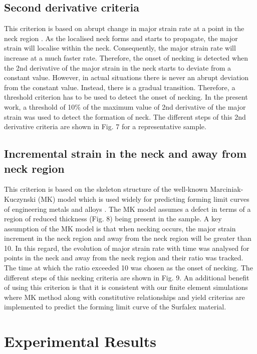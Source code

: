 \documentclass[11pt]{article} %
\begin{document}
\subsection{Second derivative criteria}
This criterion is based on abrupt change in major strain rate at a point in the neck region \cite{Song2019}. As the localised neck forms and starts to propagate, the major strain will localise within the neck. Consequently, the major strain rate will increase at a much faster rate. Therefore, the onset of necking is detected when the 2nd derivative of the major strain in the neck starts to deviate from a constant value.  However, in actual situations there is never an abrupt deviation from the constant value. Instead, there is a gradual transition. Therefore, a threshold criterion has to be used to detect the onset of necking. In the present work, a threshold of 10\% of the maximum value of 2nd derivative of the major strain was used to detect the formation of neck. The different steps of this 2nd derivative criteria are shown in Fig. 7 for a representative sample. 

\subsection{Incremental strain in the neck and away from neck region}
This criterion is based on the skeleton structure of the well-known Marciniak-Kuczynski (MK) model which is used widely for predicting forming limit curves of engineering metals and alloys \cite{Banabic2010}. The MK model assumes a defect in terms of a region of reduced thickness (Fig. 8) being present in the sample. A key assumption of the MK model is that when necking occurs, the major strain increment in the neck region and away from the neck region will be greater than 10\cite{Narasimhan1991}. In this regard, the evolution of major strain rate with time was analysed for points in the neck and away from the neck region and their ratio was tracked. The time at which the ratio exceeded 10 was chosen as the onset of necking. The different steps of this necking criteria are shown in Fig. 9. An additional benefit of using this criterion is that it is consistent with our finite element simulations where MK method along with constitutive relationships and yield criterias are implemented to predict the forming limit curve of the Surfalex material.   

\section{Experimental Results}
\end{document}
